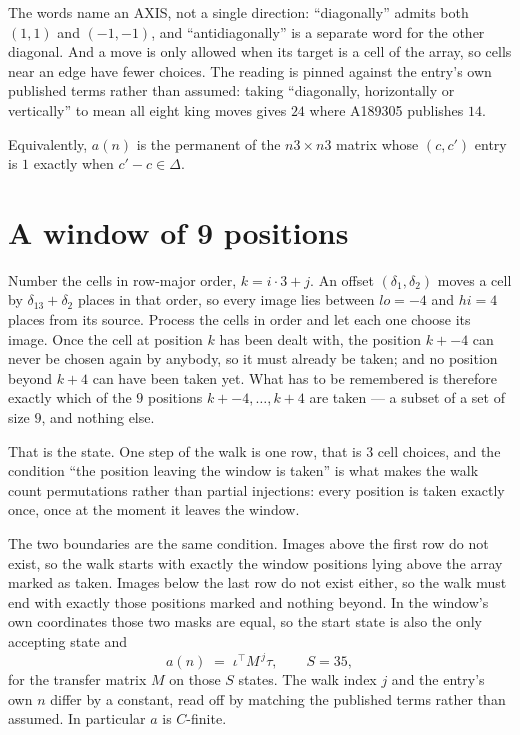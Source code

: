 \documentclass[11pt,a4paper]{article}
\theoremstyle{plain}
\theoremstyle{definition}
\begin{document}
The words name an AXIS, not a single direction: ``diagonally'' admits
both $(1,1)$ and $(-1,-1)$, and ``antidiagonally'' is a separate word for the other diagonal.
And a move is only allowed when its target is a cell of the array, so cells near an
edge have fewer choices. The reading is pinned against the entry's own published terms rather
than assumed: taking ``diagonally, horizontally or vertically'' to mean all eight king moves
gives $24$ where A189305 publishes $14$.

Equivalently, $a(n)$ is the permanent of the $n3\times n3$ matrix whose $(c,c')$ entry is
$1$ exactly when $c'-c\in\Delta$.

\section{A window of 9 positions}

Number the cells in row-major order, $k=i\cdot3+j$. An offset $(\delta_1,\delta_2)$ moves a
cell by $\delta_13+\delta_2$ places in that order, so every image lies between $lo=-4$ and
$hi=4$ places from its source. Process the cells in order and let each one choose its image.
Once the cell at position $k$ has been dealt with, the position $k+-4$ can never be chosen
again by anybody, so it must already be taken; and no position beyond $k+4$ can have been
taken yet. What has to be remembered is therefore exactly which of the $9$ positions
$k+-4,\dots,k+4$ are taken --- a subset of a set of size $9$, and nothing else.

That is the state. One step of the walk is one row, that is $3$ cell choices, and the
condition ``the position leaving the window is taken'' is what makes the walk count permutations
rather than partial injections: every position is taken exactly once, once at the moment it
leaves the window.

The two boundaries are the same condition. Images above the first row do not exist, so the walk
starts with exactly the window positions lying above the array marked as taken. Images below the
last row do not exist either, so the walk must end with exactly those positions marked and
nothing beyond. In the window's own coordinates those two masks are equal, so the start state is
also the only accepting state and
\[
a(n)\;=\;\iota^{\!\top}M^{\,j}\tau ,\qquad S=35,
\]
for the transfer matrix $M$ on those $S$ states. The walk index $j$ and the entry's own $n$
differ by a constant, read off by matching the published terms rather than assumed. In
particular $a$ is $C$-finite.
\end{document}
